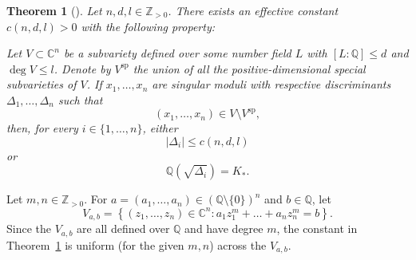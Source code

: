 \documentclass[11pt,a4paper, british]{amsart}
\newtheorem{thm}{Theorem}[section]
\theoremstyle{definition}
\theoremstyle{remark}
\numberwithin{equation}{section}
\newcommand{\Q}{\mathbb{Q}} %
\newcommand{\Z}{\mathbb{Z}} %
\newcommand{\C}{\mathbb{C}} %
\begin{document}
\begin{thm}[{\cite[Theorem~1]{Binyamini19}}]\label{thm:effAO}
	Let $n, d, l \in \Z_{>0}$. There exists an effective constant $c(n, d, l)>0$ with the following property: 
	
	Let $V \subset \C^n$ be a subvariety defined over some number field $L$ with $[L : \Q] \leq d$ and $\deg V \leq l$. Denote by $V^\mathrm{sp}$ the union of all the positive-dimensional special subvarieties of $V$. If $x_1, \ldots, x_n$ are singular moduli with respective discriminants $\Delta_1, \ldots, \Delta_n$ such that
	\[(x_1, \ldots, x_n) \in V \setminus V^\mathrm{sp},\]
	then, for every $i \in \{1, \ldots, n\}$, either
	\[ \lvert \Delta_i \rvert \leq c\left(n, d, l\right)\]
	or
	\[ \Q\left(\sqrt{\Delta_i}\right) = K_*.\]
\end{thm}

Let $m, n \in \Z_{>0}$. For $a = (a_1, \ldots, a_n) \in (\Q \setminus \{0\})^n$ and $b \in \Q$, let
\[ V_{a, b} = \left\{\left(z_1, \ldots, z_n\right) \in \C^n :a_1 z_1^m + \ldots + a_n z_n^m = b \right\}.\]
Since the $V_{a, b}$ are all defined over $\Q$ and have degree $m$, the constant in Theorem~\ref{thm:effAO} is uniform (for the given $m, n$) across the $V_{a, b}$.
\end{document}
